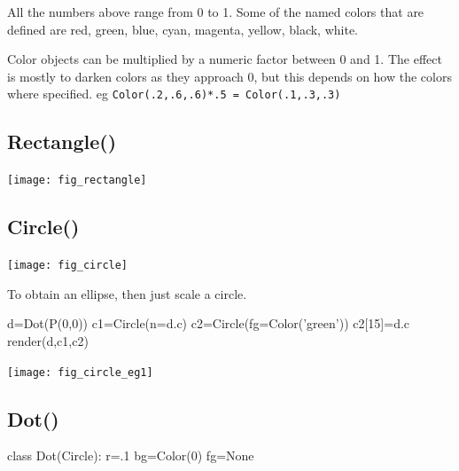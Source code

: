 \documentclass[a4paper]{book}
\begin{document}
All the numbers above range from 0 to 1. Some of the named colors that
are defined are red, green, blue, cyan, magenta, yellow, black, white.

Color objects can be multiplied by a numeric factor between 0 and 1.
The effect is mostly to darken colors as they approach 0,
but this depends on how the colors where specified.
eg \Verb|Color(.2,.6,.6)*.5 = Color(.1,.3,.3)|

\subsection{Rectangle()}
\label{sec:rectangle}

\begin{center}
  \texttt{[image: fig\_rectangle]}
\end{center}

\subsection{Circle()}
\label{sec:circle}

\begin{center}
  \texttt{[image: fig\_circle]}
\end{center}

To obtain an ellipse, then just scale a circle.

\begin{example}
\begin{python}
d=Dot(P(0,0))
c1=Circle(n=d.c)
c2=Circle(fg=Color('green'))
c2[15]=d.c
render(d,c1,c2)
\end{python}
\begin{center}
  \texttt{[image: fig\_circle\_eg1]}
\end{center}
\end{example}

\subsection{Dot()}
\label{sec:dot}
\begin{python}
class Dot(Circle):
    r=.1
    bg=Color(0)
    fg=None
\end{python}
\end{document}
